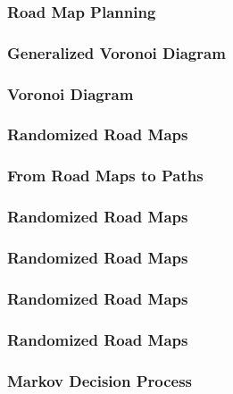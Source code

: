 \begin{frame}
	\frametitle{Road Map Planning}
	
\end{frame}


\begin{frame}
	\frametitle{Generalized Voronoi Diagram}
	
\end{frame}

\begin{frame}
	\frametitle{Voronoi Diagram}
	
\end{frame}

\begin{frame}
	\frametitle{Randomized Road Maps}
	
\end{frame}

\begin{frame}
	\frametitle{From Road Maps to Paths}
	
\end{frame}

\begin{frame}
	\frametitle{Randomized Road Maps}
	
\end{frame}

\begin{frame}
	\frametitle{Randomized Road Maps}
	
\end{frame}

\begin{frame}
	\frametitle{Randomized Road Maps}
	
\end{frame}

\begin{frame}
	\frametitle{Randomized Road Maps}
	
\end{frame}

\begin{frame}
	\frametitle{Markov Decision Process}
	
\end{frame}

